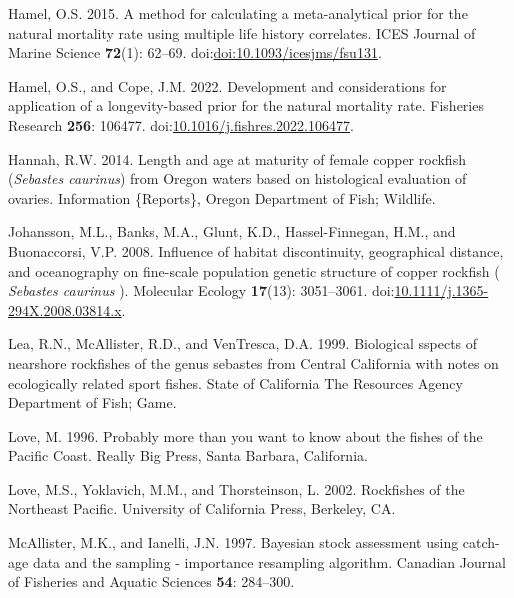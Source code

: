 \documentclass[11pt,
  english,
  letterpaper,
]{article}
\newlength{\cslhangindent}
\newenvironment{CSLReferences}[2] %
 {%
  \setlength{\parindent}{0pt}
  \ifodd #1 \everypar{\setlength{\hangindent}{\cslhangindent}}\ignorespaces\fi
  \ifnum #2 > 0
  \setlength{\parskip}{#2\baselineskip}
  \fi
 }%
 {}
\begin{document}
\begin{CSLReferences}{1}{0}
\leavevmode{}%
Hamel, O.S. 2015. A method for calculating a meta-analytical prior for the natural mortality rate using multiple life history correlates. ICES Journal of Marine Science \textbf{72}(1): 62--69. doi:\href{https://doi.org/doi:10.1093/icesjms/fsu131}{doi:10.1093/icesjms/fsu131}.

\leavevmode{}%
Hamel, O.S., and Cope, J.M. 2022. Development and considerations for application of a longevity-based prior for the natural mortality rate. Fisheries Research \textbf{256}: 106477. doi:\href{https://doi.org/10.1016/j.fishres.2022.106477}{10.1016/j.fishres.2022.106477}.

\leavevmode{}%
Hannah, R.W. 2014. Length and age at maturity of female copper rockfish (\emph{{Sebastes} caurinus}) from {Oregon} waters based on histological evaluation of ovaries. Information \{Reports\}, Oregon Department of Fish; Wildlife.

\leavevmode{}%
Johansson, M.L., Banks, M.A., Glunt, K.D., Hassel-Finnegan, H.M., and Buonaccorsi, V.P. 2008. Influence of habitat discontinuity, geographical distance, and oceanography on fine-scale population genetic structure of copper rockfish ( \emph{{Sebastes} caurinus} ). Molecular Ecology \textbf{17}(13): 3051--3061. doi:\href{https://doi.org/10.1111/j.1365-294X.2008.03814.x}{10.1111/j.1365-294X.2008.03814.x}.

\leavevmode{}%
Lea, R.N., McAllister, R.D., and VenTresca, D.A. 1999. Biological sspects of nearshore rockfishes of the genus sebastes from {Central} {California} with notes on ecologically related sport fishes. State of California The Resources Agency Department of Fish; Game.

\leavevmode{}%
Love, M. 1996. Probably more than you want to know about the fishes of the {Pacific} {Coast}. Really Big Press, Santa Barbara, California.

\leavevmode{}%
Love, M.S., Yoklavich, M.M., and Thorsteinson, L. 2002. Rockfishes of the {Northeast} {Pacific}. University of California Press, Berkeley, CA.

\leavevmode{}%
McAllister, M.K., and Ianelli, J.N. 1997. Bayesian stock assessment using catch-age data and the sampling - importance resampling algorithm. Canadian Journal of Fisheries and Aquatic Sciences \textbf{54}: 284--300.


\end{CSLReferences}
\end{document}
